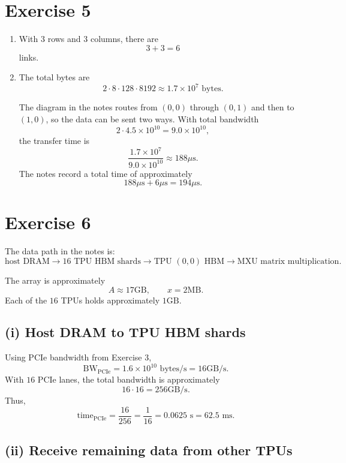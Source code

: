 \documentclass[11pt]{article}
\begin{document}
\section*{Exercise 5}

\begin{enumerate}[label=(\alph*)]
  \item With $3$ rows and $3$ columns, there are
  \[
  3 + 3 = 6
  \]
  links.

  \item The total bytes are
  \[
  2 \cdot 8 \cdot 128 \cdot 8192
  \approx 1.7 \times 10^7 \text{ bytes}.
  \]

  The diagram in the notes routes from $(0,0)$ through $(0,1)$ and then to $(1,0)$, so the data can be sent two ways. With total bandwidth
  \[
  2 \cdot 4.5 \times 10^{10} = 9.0 \times 10^{10},
  \]
  the transfer time is
  \[
  \frac{1.7 \times 10^7}{9.0 \times 10^{10}}
  \approx 188 \mu\mathrm{s}.
  \]
  The notes record a total time of approximately
  \[
  188 \mu\mathrm{s} + 6 \mu\mathrm{s} = 194 \mu\mathrm{s}.
  \]
\end{enumerate}

\section*{Exercise 6}

The data path in the notes is:
\[
\text{host DRAM}
\rightarrow
16 \text{ TPU HBM shards}
\rightarrow
\text{TPU }(0,0)\text{ HBM}
\rightarrow
\text{MXU matrix multiplication}.
\]

The array is approximately
\[
A \approx 17 \mathrm{GB},
\qquad
x = 2 \mathrm{MB}.
\]
Each of the $16$ TPUs holds approximately $1 \mathrm{GB}$.

\subsection*{(i) Host DRAM to TPU HBM shards}

Using PCIe bandwidth from Exercise 3,
\[
\mathrm{BW}_{\mathrm{PCIe}} = 1.6 \times 10^{10} \text{ bytes/s}
  = 16 \mathrm{GB/s}.
\]
With $16$ PCIe lanes, the total bandwidth is approximately
\[
16 \cdot 16 = 256 \mathrm{GB/s}.
\]
Thus,
\[
\text{time}_{\mathrm{PCIe}}
  =
  \frac{16}{256}
  =
  \frac{1}{16}
  =
  0.0625\text{ s}
  =
  62.5\text{ ms}.
\]

\subsection*{(ii) Receive remaining data from other TPUs}
\end{document}
